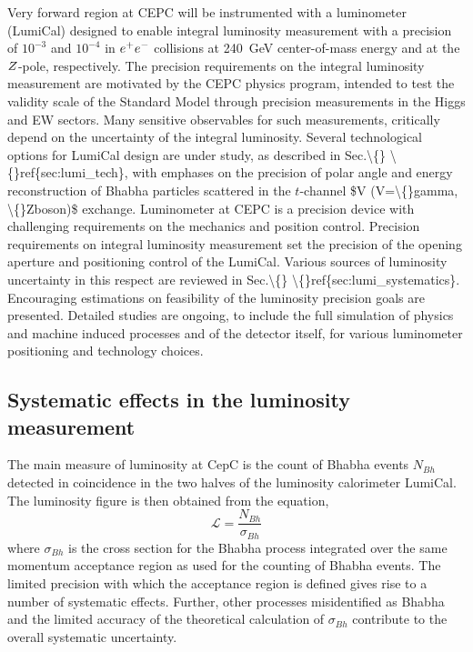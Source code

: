 Very forward region at CEPC will be instrumented with a luminometer (LumiCal) designed to enable integral luminosity measurement with a precision of $10^{-3}$ and $10^{-4}$ in $e^+ e^-$ collisions at 240~GeV center-of-mass energy and at the $Z$-pole, respectively. The precision requirements on the integral luminosity measurement are motivated by the CEPC physics program, intended to test the validity scale of the Standard Model through precision measurements in the Higgs and EW sectors. Many sensitive observables for such measurements, critically depend on the uncertainty of the integral luminosity. Several technological options for LumiCal design are under study, as described in Sec.\textbackslash\{\} \textbackslash\{\}ref\{sec:lumi\_tech\}, with emphases on the precision of polar angle and energy reconstruction of Bhabha particles scattered in the $t$-channel \$V (V=\textbackslash\{\}gamma, \textbackslash\{\}Zboson)\$ exchange. Luminometer at CEPC is a precision device with challenging requirements on the mechanics and position control. Precision requirements on integral luminosity measurement set the precision of the opening aperture and positioning control of the LumiCal. Various sources of luminosity uncertainty in this respect are reviewed in Sec.\textbackslash\{\} \textbackslash\{\}ref\{sec:lumi\_systematics\}. Encouraging estimations on feasibility of the luminosity precision goals are presented. Detailed studies are ongoing, to include the full simulation of physics and machine induced processes and of the detector itself, for various luminometer positioning and technology choices.


\subsection{Systematic effects in the luminosity measurement}
\label{sec:lumi_systematics}
The main measure of luminosity at CepC is the count of Bhabha events $N_{Bh}$ detected in coincidence in the two halves of the luminosity calorimeter LumiCal. The luminosity figure is then obtained from the equation,
\begin{equation}\label{eq:lumi}
\mathcal{L} = \frac{N_{Bh}}{\sigma_{Bh}}
\end{equation}
where $\sigma_{Bh}$ is the cross section for the Bhabha process integrated over the same momentum acceptance region as used for the counting of Bhabha events. The limited precision with which the acceptance region is defined gives rise to a number of systematic effects. Further, other processes misidentified as Bhabha and the limited accuracy of the theoretical calculation of $\sigma_{Bh}$ contribute to the overall systematic uncertainty.

